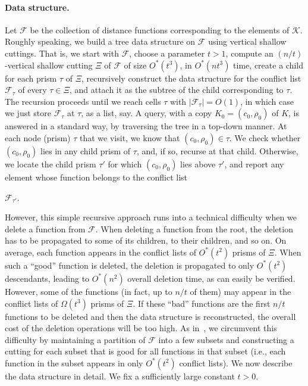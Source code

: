 \documentclass[11pt]{article}
\newif\iffullver
\def\F{\mathcal{F}}
\def\K{\mathcal{K}}
\def\cell{\tau}
\theoremstyle{definition}
\begin{document}
\paragraph{Data structure.}
\fi
Let $\F$ be the collection of distance functions corresponding to the elements of $\K$.
Roughly speaking, we build a tree data structure on $\F$ using vertical shallow cuttings. 
That is, we start with $\F$, choose a parameter $t>1$, compute an $(n/t)$-vertical shallow 
cutting $\Xi$ of $\F$ of size $O^*(t^3)$, in $O^*(nt^3)$ time, 
create a child for each prism 
$\cell$ of $\Xi$, recursively construct the data structure for the conflict list 
$\F_\cell$ of every $\cell\in\Xi$, and attach it as the subtree of the child corresponding 
to $\cell$. The recursion proceeds until we reach cells $\cell$ with $|\F_\cell| = O(1)$,
in which case we just store $\F_\cell$ at $\cell$, as a list, say.
%
A query, with a copy $K_0 = (c_0,\rho_0)$ of $K$, is answered in a standard way, by
traversing the tree in a top-down manner. At each node (prism) $\cell$ that we visit,
we know that $(c_0,\rho_0)\in\cell$. We check whether $(c_0,\rho_0)$ lies in any
child prism of $\cell$, and, if so, recurse at that child. Otherwise, we locate the
child prism $\cell'$ for which $(c_0,\rho_0)$ lies above $\cell'$, and report any
element whose function belongs to the conflict list 
\iffullver
$\F_{\tau'}$ (or report all of them
in the reporting version).
\else
$\F_{\tau'}$.
\fi
%
However, this simple recursive approach runs into a technical difficulty
when we delete a function from $\F$.
When deleting a function from the root, the deletion has to be propagated to some of 
its children, to their children, and so on. On average, each function appears in 
the conflict lists of $O^*(t^2)$ prisms of $\Xi$. When such a ``good'' function is deleted, 
the deletion is propagated to only $O^*(t^2)$ descendants, leading to $O^*(n^2)$ overall deletion 
time, as can easily be verified. However, some of the functions (in fact, up to $n/t$ of them) may appear 
in the conflict lists of $\Omega(t^3)$ prisms of $\Xi$.
If these ``bad'' functions are the first $n/t$ functions to be deleted and then the data structure 
is reconstructed, the overall cost of the deletion operations will be too high. 
As in~\cite{AM95,KMRSS}, we circumvent this difficulty by maintaining a partition of $\F$ into a few 
subsets and constructing a cutting for each subset that is good for all functions in that subset 
(i.e., each function in the subset appears in only $O^*(t^2)$ conflict lists). 
%
We now describe the data structure in detail. We fix a sufficiently large constant $t>0$.
\end{document}
